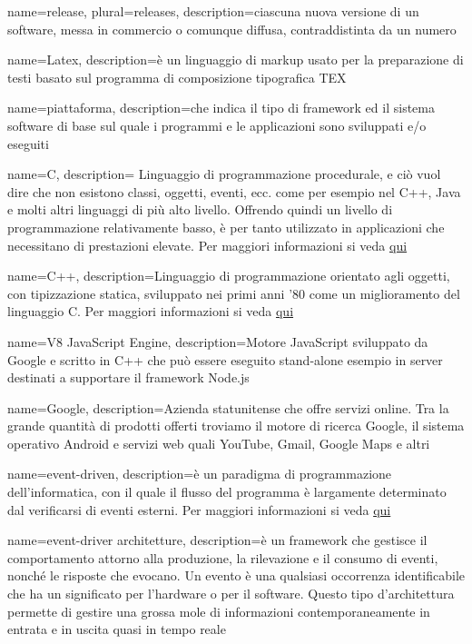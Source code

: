  {
    name=release,
    plural=releases,
    description={ciascuna nuova versione di un software, messa in commercio o comunque diffusa, contraddistinta da un numero}
}

 {
	name=Latex,
	description={è un linguaggio di markup usato per la preparazione di testi basato sul programma di composizione tipografica TEX}
}

 {
	name=piattaforma,
	description={che indica il tipo di framework ed il sistema software di base sul quale i programmi e le applicazioni sono sviluppati e/o eseguiti}
	}


 {
	name=C,
	description={ Linguaggio di programmazione procedurale, e ciò vuol dire che non esistono classi, oggetti, eventi, ecc. come per esempio nel C++, Java e molti altri linguaggi di più alto livello. Offrendo quindi un livello di programmazione relativamente basso, è per tanto utilizzato in applicazioni che necessitano di prestazioni elevate. Per maggiori informazioni si veda \href{https://it.wikiversity.org/wiki/Linguaggio_C}{qui} }
}

 {
	name=C++,
	description={Linguaggio di programmazione orientato agli oggetti, con tipizzazione statica, sviluppato nei primi anni '80 come un miglioramento del linguaggio C. Per maggiori informazioni si veda \href{https://it.wikiversity.org/wiki/C\%2B\%2B}{qui}}
}


 {
	name=V8 JavaScript Engine,
	description={Motore JavaScript  sviluppato da Google e scritto in C++ che  può essere eseguito stand-alone esempio in server destinati a supportare il framework Node.js}
}

 {
	name=Google,
	description={Azienda statunitense che offre servizi online. Tra la grande quantità di prodotti offerti troviamo il motore di ricerca Google, il sistema operativo Android e servizi web quali YouTube, Gmail, Google Maps e altri}
}

 {
	name=event-driven,
	description={è un paradigma di programmazione dell'informatica, con il quale il flusso del programma è largamente determinato dal verificarsi di eventi esterni. Per maggiori informazioni si veda \href{https://it.wikipedia.org/wiki/Programmazione_a_eventi}{qui}}
}

 {
	name=event-driver architetture,
	description={è un framework che gestisce il comportamento attorno alla produzione, la rilevazione e il consumo di eventi, nonché le risposte che evocano. Un evento è una qualsiasi occorrenza identificabile che ha un significato per l'hardware o per il software. Questo tipo d'architettura  permette di gestire  una grossa mole di informazioni contemporaneamente  in entrata e in uscita quasi in tempo reale}
}

